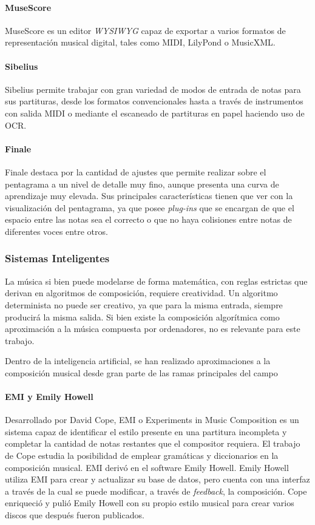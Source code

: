 \paragraph{MuseScore}
MuseScore es un editor \textit{WYSIWYG} capaz de exportar a varios formatos de representación musical digital, tales como MIDI, LilyPond o MusicXML.

\paragraph{Sibelius}
Sibelius permite trabajar con gran variedad de modos de entrada de notas para sus partituras, desde los formatos convencionales hasta a través de instrumentos con salida MIDI o mediante el escaneado de partituras en papel haciendo uso de OCR.

\paragraph{Finale}
Finale destaca por la cantidad de ajustes que permite realizar sobre el pentagrama a un nivel de detalle muy fino, aunque presenta una curva de aprendizaje muy elevada. Sus principales características  tienen que ver con la visualización del pentagrama, ya que posee \textit{plug-ins} que se encargan de que el espacio entre las notas sea el correcto o que no haya colisiones entre notas de diferentes voces entre otros.

\subsubsection{Sistemas Inteligentes}
La música si bien puede modelarse de forma matemática, con reglas estrictas que derivan en algoritmos de composición, requiere creatividad. Un algoritmo determinista no puede ser creativo, ya que para la misma entrada, siempre producirá la misma salida. Si bien existe la composición algorítmica como aproximación a la música compuesta por ordenadores, no es relevante para este trabajo.

Dentro de la inteligencia artificial, se han realizado aproximaciones a la composición musical desde gran parte de las ramas principales del campo

\paragraph{EMI y Emily Howell}
Desarrollado por David Cope, EMI o Experiments in Music Composition es un sistema capaz de identificar el estilo presente en una partitura incompleta y completar la cantidad de notas restantes que el compositor requiera. El trabajo de Cope estudia la posibilidad de emplear gramáticas y diccionarios en la composición musical. EMI derivó en el software Emily Howell.
Emily Howell utiliza EMI para crear y actualizar su base de datos, pero cuenta con una interfaz a través de la cual se puede modificar, a través de \textit{feedback}, la composición. Cope enriqueció y pulió Emily Howell con su propio estilo musical para crear varios discos que después fueron publicados.

